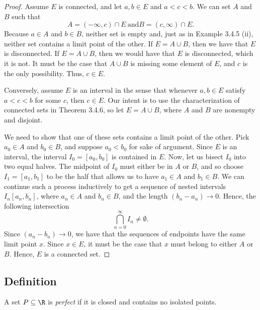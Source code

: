 \begin{proof}
Assume \( E \) is connected, and let \( a, b \in E  \) and \( a < c < b  \). We can set \( A  \) and \( B  \) such that 
\[  A = (-\infty, c ) \cap E ~ \text{and} B = (c, \infty ) \cap E.  \]
Because \( a \in A  \) and \( b \in B \), neither set is empty and, just as in Example 3.4.5 (ii), neither set contains a limit point of the other. If \( E = A \cup B  \), then we have that \( E  \) is disconnected. If \( E = A \cup B  \), then we would have that \( E  \) is disconnected, which it is not. It must be the case that \( A \cup B  \) is missing some element of \( E  \), and \( c \) is the only possibility. Thus, \( c \in E  \).

Conversely, assume \( E  \) is an interval in the sense that whenever \( a, b \in E  \) satisfy \( a < c < b  \) for some \( c  \), then  \( c \in E  \). Our intent is to use the characterization of connected sets in Theorem 3.4.6, so let \( E = A \cup B \), where \( A  \) and \( B \) are nonempty and disjoint. 

We need to show that one of these sets contains a limit point of the other. Pick \( a_0 \in A  \) and \( b_0 \in B \), and suppose \( a_0 < b_0  \) for sake of argument. Since \( E  \) is an interval, the interval \( I_0 = [a_0, b_0 ] \) is contained in \( E  \). Now, let us bisect \( I_0 \) into two equal halves. The midpoint of \( I_0  \) must either be in \( A \) or \( B \), and so choose \( I_1 = [a_1, b_1 ]  \) to be the half that allows us to have \( a_1 \in A  \) and \( b_1 \in B \). We can continue such a process inductively to get a sequence of nested intervals \( I_n [a_n, b_n] \), where \( a_n \in A \) and \( b_n \in B \), and the length \( (b_n - a_n) \to 0  \). Hence, the following intersection
\[ \bigcap_{ n=0  }^{ \infty  } I_n \neq \emptyset. \]
Since \( (a_n - b_n ) \to 0  \), we have that the sequences of endpoints have the same limit point \( x  \). Since \( x \in E  \), it must be the case that \( x  \) must belong to either \( A  \) or \( B \). Hence, \( E \) is a connected set. 
\end{proof}


\subsection{Definition}


\begin{tcolorbox}
\begin{defn}
A set \( P \subseteq \R \) is \textit{perfect} if it is closed and contains no isolated points. \end{defn} 
\end{tcolorbox}


